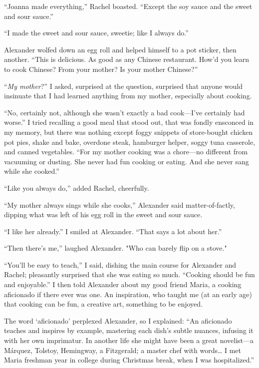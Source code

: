 ``Joanna made everything,'' Rachel boasted. ``Except the soy sauce and
the sweet and sour sauce.''

``I made the sweet and sour sauce, sweetie; like I always do.''

Alexander wolfed down an egg roll and helped himself to a pot sticker,
then another. ``This is delicious. As good as any Chinese restaurant.
How'd you learn to cook Chinese? From your mother? Is your mother
Chinese?''

``\emph{My mother}?'' I asked, surprised at the question, surprised that
anyone would insinuate that I had learned anything from my mother,
especially about cooking.

``No, certainly not, although she wasn't exactly a bad cook---I've
certainly had worse.'' I tried recalling a good meal that stood out,
that was fondly ensconced in my memory, but there was nothing except
foggy snippets of store-bought chicken pot pies, shake and bake,
overdone steak, hamburger helper, soggy tuna casserole, and canned
vegetables. ``For my mother cooking was a chore---no different from
vacuuming or dusting. She never had fun cooking or eating. And she never
sang while she cooked.''

``Like you always do,'' added Rachel, cheerfully.

``My mother always sings while she cooks,'' Alexander said
matter-of-factly, dipping what was left of his egg roll in the sweet and
sour sauce.

``I like her already.'' I smiled at Alexander. ``That says a lot about
her.''

``Then there's me,'' laughed Alexander. "Who can barely flip on a
stove."

``You'll be easy to teach,'' I said, dishing the main course for
Alexander and Rachel; pleasantly surprised that she was eating so much.
``Cooking should be fun and enjoyable.'' I then told Alexander about my
good friend Maria, a cooking aficionado if there ever was one. An
inspiration, who taught me (at an early age) that cooking can be fun, a
creative art, something to be enjoyed.

The word `aficionado' perplexed Alexander, so I explained: ``An
aficionado teaches and inspires by example, mastering each dish's subtle
nuances, infusing it with her own imprimatur. In another life she might
have been a great novelist---a Márquez, Tolstoy, Hemingway, a
Fitzgerald; a master chef with words\ldots{} I met Maria freshman year
in college during Christmas break, when I was hospitalized.''

